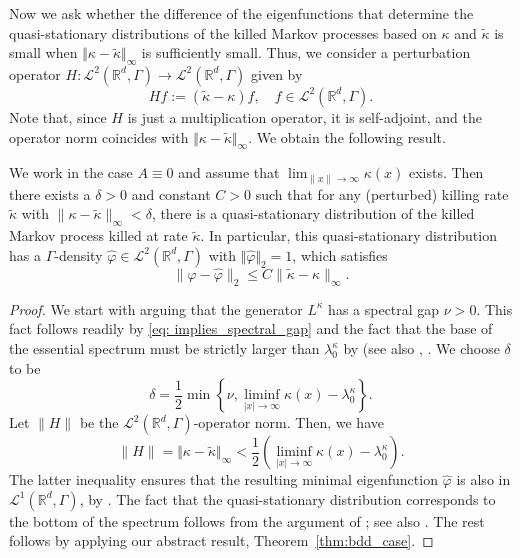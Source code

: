 \documentclass{aptpub}
\newcommand{\Rd}{\mathbb R^d}
\begin{document}
 Now we ask whether the difference of the eigenfunctions that determine the quasi-stationary distributions of the killed Markov processes based on $\kappa$ and $\widetilde{\kappa}$ is small when $\Vert \kappa - \widetilde{\kappa} \Vert_\infty$ is sufficiently small. 
 Thus, we consider a perturbation operator $H\colon \mathcal{L}^2(\Rd,\Gamma)\to  \mathcal{L}^2(\Rd,\Gamma)$ given by
    \begin{equation*}
        Hf := (\widetilde \kappa - \kappa)f, \quad f \in \mathcal L^2(\Rd,\Gamma).
    \end{equation*}
 Note that, since $H$ is just a multiplication operator, it is self-adjoint, and the operator norm coincides with $\Vert \kappa - \widetilde{\kappa} \Vert_\infty$. We obtain the following result.
\begin{proposition}  \label{prop:logistic_BM}
    We work in the case $A\equiv 0$ and assume that $\lim_{\|x\|\to\infty}\kappa(x)$ exists. Then there exists a $\delta >0$ and constant $C>0$ such that for any (perturbed) killing rate $\widetilde \kappa$ with $\|\kappa-\tilde \kappa\|_\infty < \delta$, there is a quasi-stationary distribution of the killed Markov process killed at rate $\widetilde\kappa$. In particular, this quasi-stationary distribution has a $\Gamma$-density $\widehat\varphi \in \mathcal L^2(\Rd,\Gamma)$ 
    with $\Vert \widehat{\varphi} \Vert_2 = 1$, which satisfies 
    \begin{equation*}
        \|\varphi-\widehat \varphi \|_2 \le C \|\tilde\kappa-\kappa\|_\infty.
    \end{equation*}
 \end{proposition}
\begin{proof}
We start with arguing that the generator $L^\kappa$ has a spectral gap $\nu>0$. This fact follows readily by \eqref{eq: implies_spectral_gap} and the fact that the base of the essential spectrum must be strictly larger than $\lambda_0^\kappa$ by \cite[Lemma~14.4.1]{Davies2007} (see also \cite[Lemma 3.3(v)]{Kolb2012}, \cite[Remark 1, Section 1.4]{Wang2019TheoQSMC}.
    We choose $\delta$ to be
    \begin{equation*}
        \delta =\frac{1}{2}\min\left \{\nu, \liminf_{\vert x\vert\to \infty}\kappa(x) - \lambda_0^\kappa \right \}.
    \end{equation*}
Let $\|H\|$ be the $\mathcal L^2(\Rd,\Gamma)$-operator norm. Then, we have
\[\|H\| = \Vert \kappa-\widetilde{\kappa} \Vert_\infty
< \frac{1}{2}\left (\liminf_{\vert x\vert \to \infty}\kappa(x) - \lambda_0^\kappa\right).\]
The latter inequality
ensures that the resulting minimal eigenfunction $\widehat \varphi$ is also in $\mathcal L^1(\Rd,\Gamma)$, by \cite[Theorem 4.5]{Champagnat2017}. The fact that the quasi-stationary distribution corresponds to the bottom of the spectrum follows from the argument of \cite{Simon1993}; see also \cite[Section 4.2]{Kolb2012}. The rest follows by applying our abstract result, Theorem~\ref{thm:bdd_case}.
\end{proof}
\end{document}
